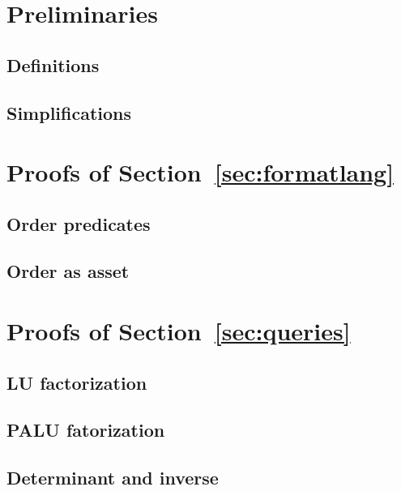 
\section{Preliminaries}

\subsection{Definitions}


\subsection{Simplifications}



\section{Proofs of Section~\ref{sec:formatlang}}

\subsection{Order predicates}\label{app:order}

\subsection{Order as asset}\label{app:asset_order}



\section{Proofs of Section~\ref{sec:queries}}

\subsection{LU factorization}


\subsection{PALU fatorization}


\subsection{Determinant and inverse}\label{app:inverse}



